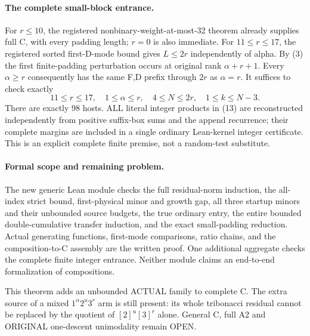 \paragraph{The complete small-block entrance.}
For $r\le10$, the registered nonbinary-weight-at-most-32 theorem
already supplies full C, with every padding length; $r=0$ is also
immediate. For $11\le r\le17$, the registered sorted first-D-mode
bound gives $L\le2r$ independently of alpha. By (3) the first
finite-padding perturbation occurs at original rank
$\alpha+r+1$. Every $\alpha\ge r$ consequently has the same
F,D prefix through $2r$ as $\alpha=r$. It suffices to check exactly
\[
 11\le r\le17,\quad 1\le\alpha\le r,\quad
 4\le N\le2r,\quad1\le k\le N-3.                 \tag{13}
\]
There are exactly 98 hosts. ALL literal integer products in (13)
are reconstructed independently from positive suffix-box sums and
the append recurrence; their complete margins are included in a
single ordinary Lean-kernel integer certificate. This is an explicit
complete finite premise, not a random-test substitute.

\paragraph{Formal scope and remaining problem.}
The new generic Lean module checks the full residual-norm induction,
the all-index strict bound, first-physical minor and growth gap,
all three startup minors and their unbounded source budgets,
the true ordinary entry, the entire bounded double-cumulative
transfer induction, and the exact small-padding reduction.
Actual generating functions, first-mode comparisons, ratio chains,
and the composition-to-C assembly are the written proof. One
additional aggregate checks the complete finite integer entrance.
Neither module claims an end-to-end formalization of compositions.

This theorem adds an unbounded ACTUAL family to complete C.
The extra source of a mixed $1^\alpha2^u3^r$ arm is still present:
its whole tribonacci residual cannot be replaced by the quotient
of $[2]^u[3]^r$ alone. General C, full A2 and ORIGINAL one-descent
unimodality remain OPEN.

